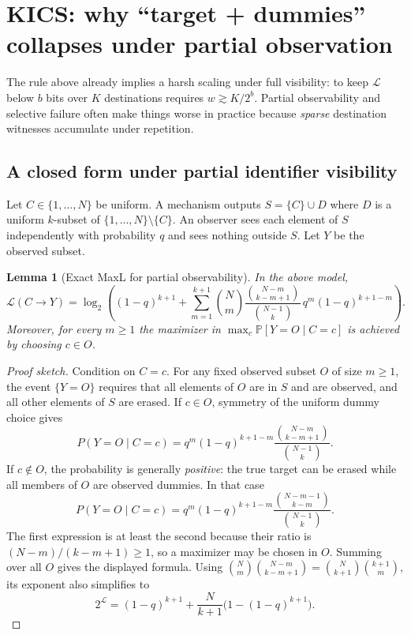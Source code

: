 \documentclass[11pt]{article}
\newcommand{\Prb}{\mathbb{P}}
\newcommand{\MaxL}{\mathcal{L}}
\newcommand{\logtwo}{\log_2}
\newtheorem{lemma}{Lemma}
\begin{document}
\section{KICS: why ``target + dummies'' collapses under partial observation}\label{sec:kics}
The rule above already implies a harsh scaling under full visibility: to keep $\MaxL$ below $b$ bits over $K$ destinations requires $w \gtrsim K/2^b$.
Partial observability and selective failure often make things worse in practice because \emph{sparse} destination witnesses accumulate under repetition.

\subsection{A closed form under partial identifier visibility}
Let $C\in\{1,\dots,N\}$ be uniform.
A mechanism outputs $S=\{C\}\cup D$ where $D$ is a uniform $k$-subset of $\{1,\dots,N\}\setminus\{C\}$.
An observer sees each element of $S$ independently with probability $q$ and sees nothing outside $S$.
Let $Y$ be the observed subset.

\begin{lemma}[Exact MaxL for partial observability]\label{lem:kics-partial-obs}
In the above model,
\[
\MaxL(C\!\to\!Y)
= \logtwo\!\left(
(1-q)^{k+1} + \sum_{m=1}^{k+1} \binom{N}{m}\frac{\binom{N-m}{k-m+1}}{\binom{N-1}{k}}\, q^{m}(1-q)^{k+1-m}
\right).
\]
Moreover, for every $m\ge 1$ the maximizer in $\max_c \Prb[Y=O\mid C=c]$ is achieved by choosing $c\in O$.
\end{lemma}
\begin{proof}[Proof sketch]
Condition on $C=c$.
For any fixed observed subset $O$ of size $m\ge 1$, the event $\{Y=O\}$ requires that all elements of $O$ are in $S$ and are observed, and all other elements of $S$ are erased.
If $c\in O$, symmetry of the uniform dummy choice gives
\[
P(Y=O\mid C=c)=q^m(1-q)^{k+1-m}\frac{\binom{N-m}{k-m+1}}{\binom{N-1}{k}}.
\]
If $c\notin O$, the probability is generally \emph{positive}: the true target can be erased while all members of $O$ are observed dummies. In that case
\[
P(Y=O\mid C=c)=q^m(1-q)^{k+1-m}\frac{\binom{N-m-1}{k-m}}{\binom{N-1}{k}}.
\]
The first expression is at least the second because their ratio is $(N-m)/(k-m+1)\ge1$, so a maximizer may be chosen in $O$. Summing over all $O$ gives the displayed formula. Using
$\binom{N}{m}\binom{N-m}{k-m+1}=\binom{N}{k+1}\binom{k+1}{m}$,
its exponent also simplifies to
\[
2^{\MaxL}=(1-q)^{k+1}+\frac{N}{k+1}\bigl(1-(1-q)^{k+1}\bigr).
\]
\end{proof}
\end{document}
